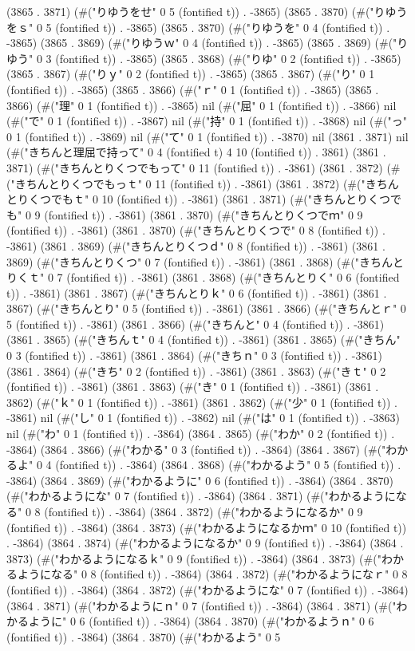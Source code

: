(3865 . 3871) (#("りゆうをせ" 0 5 (fontified t)) . -3865) (3865 . 3870) (#("りゆうをｓ" 0 5 (fontified t)) . -3865) (3865 . 3870) (#("りゆうを" 0 4 (fontified t)) . -3865) (3865 . 3869) (#("りゆうｗ" 0 4 (fontified t)) . -3865) (3865 . 3869) (#("りゆう" 0 3 (fontified t)) . -3865) (3865 . 3868) (#("りゆ" 0 2 (fontified t)) . -3865) (3865 . 3867) (#("りｙ" 0 2 (fontified t)) . -3865) (3865 . 3867) (#("り" 0 1 (fontified t)) . -3865) (3865 . 3866) (#("ｒ" 0 1 (fontified t)) . -3865) (3865 . 3866) (#("理" 0 1 (fontified t)) . -3865) nil (#("屈" 0 1 (fontified t)) . -3866) nil (#("で" 0 1 (fontified t)) . -3867) nil (#("持" 0 1 (fontified t)) . -3868) nil (#("っ" 0 1 (fontified t)) . -3869) nil (#("て" 0 1 (fontified t)) . -3870) nil (3861 . 3871) nil (#("きちんと理屈で持って" 0 4 (fontified t) 4 10 (fontified t)) . 3861) (3861 . 3871) (#("きちんとりくつでもって" 0 11 (fontified t)) . -3861) (3861 . 3872) (#("きちんとりくつでもっｔ" 0 11 (fontified t)) . -3861) (3861 . 3872) (#("きちんとりくつでもｔ" 0 10 (fontified t)) . -3861) (3861 . 3871) (#("きちんとりくつでも" 0 9 (fontified t)) . -3861) (3861 . 3870) (#("きちんとりくつでｍ" 0 9 (fontified t)) . -3861) (3861 . 3870) (#("きちんとりくつで" 0 8 (fontified t)) . -3861) (3861 . 3869) (#("きちんとりくつｄ" 0 8 (fontified t)) . -3861) (3861 . 3869) (#("きちんとりくつ" 0 7 (fontified t)) . -3861) (3861 . 3868) (#("きちんとりくｔ" 0 7 (fontified t)) . -3861) (3861 . 3868) (#("きちんとりく" 0 6 (fontified t)) . -3861) (3861 . 3867) (#("きちんとりｋ" 0 6 (fontified t)) . -3861) (3861 . 3867) (#("きちんとり" 0 5 (fontified t)) . -3861) (3861 . 3866) (#("きちんとｒ" 0 5 (fontified t)) . -3861) (3861 . 3866) (#("きちんと" 0 4 (fontified t)) . -3861) (3861 . 3865) (#("きちんｔ" 0 4 (fontified t)) . -3861) (3861 . 3865) (#("きちん" 0 3 (fontified t)) . -3861) (3861 . 3864) (#("きちｎ" 0 3 (fontified t)) . -3861) (3861 . 3864) (#("きち" 0 2 (fontified t)) . -3861) (3861 . 3863) (#("きｔ" 0 2 (fontified t)) . -3861) (3861 . 3863) (#("き" 0 1 (fontified t)) . -3861) (3861 . 3862) (#("ｋ" 0 1 (fontified t)) . -3861) (3861 . 3862) (#("少" 0 1 (fontified t)) . -3861) nil (#("し" 0 1 (fontified t)) . -3862) nil (#("は" 0 1 (fontified t)) . -3863) nil (#("わ" 0 1 (fontified t)) . -3864) (3864 . 3865) (#("わか" 0 2 (fontified t)) . -3864) (3864 . 3866) (#("わかる" 0 3 (fontified t)) . -3864) (3864 . 3867) (#("わかるよ" 0 4 (fontified t)) . -3864) (3864 . 3868) (#("わかるよう" 0 5 (fontified t)) . -3864) (3864 . 3869) (#("わかるように" 0 6 (fontified t)) . -3864) (3864 . 3870) (#("わかるようにな" 0 7 (fontified t)) . -3864) (3864 . 3871) (#("わかるようになる" 0 8 (fontified t)) . -3864) (3864 . 3872) (#("わかるようになるか" 0 9 (fontified t)) . -3864) (3864 . 3873) (#("わかるようになるかｍ" 0 10 (fontified t)) . -3864) (3864 . 3874) (#("わかるようになるか" 0 9 (fontified t)) . -3864) (3864 . 3873) (#("わかるようになるｋ" 0 9 (fontified t)) . -3864) (3864 . 3873) (#("わかるようになる" 0 8 (fontified t)) . -3864) (3864 . 3872) (#("わかるようになｒ" 0 8 (fontified t)) . -3864) (3864 . 3872) (#("わかるようにな" 0 7 (fontified t)) . -3864) (3864 . 3871) (#("わかるようにｎ" 0 7 (fontified t)) . -3864) (3864 . 3871) (#("わかるように" 0 6 (fontified t)) . -3864) (3864 . 3870) (#("わかるようｎ" 0 6 (fontified t)) . -3864) (3864 . 3870) (#("わかるよう" 0 5 